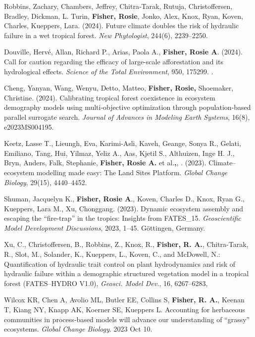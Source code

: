 \documentclass[10pt]{article}
\newenvironment{lonelist}[1][\enskip\textbullet]%
        {\vspace{-\baselineskip}\begin{list}{#1}{%
        \setlength{\itemindent}{-3pt} 
        \setlength{\partopsep}{0pt}%
        \setlength{\leftmargin}{10pt}
        \setlength{\topsep}{15pt}}}
        {\end{list}\vspace{-.3\baselineskip}}
\begin{document}
\begin{lonelist}
\item[87] Robbins, Zachary, Chambers, Jeffrey, Chitra‐Tarak, Rutuja, Christoffersen, Bradley, Dickman, L. Turin, \textbf{Fisher, Rosie}, Jonko, Alex, Knox, Ryan, Koven, Charles, Kueppers, Lara. (2024). Future climate doubles the risk of hydraulic failure in a wet tropical forest. \textit{New Phytologist}, 244(6), 2239–2250.

\item[86] Douville, Hervé, Allan, Richard P., Arias, Paola A., \textbf{Fisher, Rosie A}. (2024). Call for caution regarding the efficacy of large-scale afforestation and its hydrological effects. \textit{Science of the Total Environment}, 950, 175299. .

\item[85] Cheng, Yanyan, Wang, Wenyu, Detto, Matteo, \textbf{Fisher, Rosie,} Shoemaker, Christine. (2024). Calibrating tropical forest coexistence in ecosystem demography models using multi‐objective optimization through population‐based parallel surrogate search. \textit{Journal of Advances in Modeling Earth Systems}, 16(8), e2023MS004195. 

\item[84] Keetz, Lasse T., Lieungh, Eva, Karimi‐Asli, Kaveh, Geange, Sonya R., Gelati, Emiliano, Tang, Hui, Yilmaz, Yeliz A., Aas, Kjetil S., Althuizen, Inge H. J., Bryn, Anders, Falk, Stephanie, \textbf{Fisher, Rosie A. }et al.\textbf{,}, . (2023). Climate–ecosystem modelling made easy: The Land Sites Platform. \textit{Global Change Biology}, 29(15), 4440–4452.

\item[82] Shuman, Jacquelyn K., \textbf{Fisher, Rosie A}., Koven, Charles D., Knox, Ryan G., Kueppers, Lara M., Xu, Chonggang. (2023). Dynamic ecosystem assembly and escaping the “fire-trap” in the tropics: Insights from FATES\_15. \textit{Geoscientific Model Development Discussions}, 2023, 1–45. Göttingen, Germany.


\item[81] Xu, C., Christoffersen, B., Robbins, Z., Knox, R., \textbf{Fisher, R. A.}, Chitra-Tarak, R., Slot, M., Solander, K., Kueppers, L., Koven, C., and McDowell, N.: Quantification of hydraulic trait control on plant hydrodynamics and risk of hydraulic failure within a demographic structured vegetation model in a tropical forest (FATES–HYDRO V1.0), \emph{Geosci. Model Dev.}, 16, 6267–6283, 

\item[82]Wilcox KR, Chen A, Avolio ML, Butler EE, Collins S, \textbf{Fisher, R. A.}, Keenan T, Kiang NY, Knapp AK, Koerner SE, Kueppers L. Accounting for herbaceous communities in process‐based models will advance our understanding of “grassy” ecosystems.\emph{ Global Change Biology}. 2023 Oct 10.


\end{lonelist}
\end{document}
